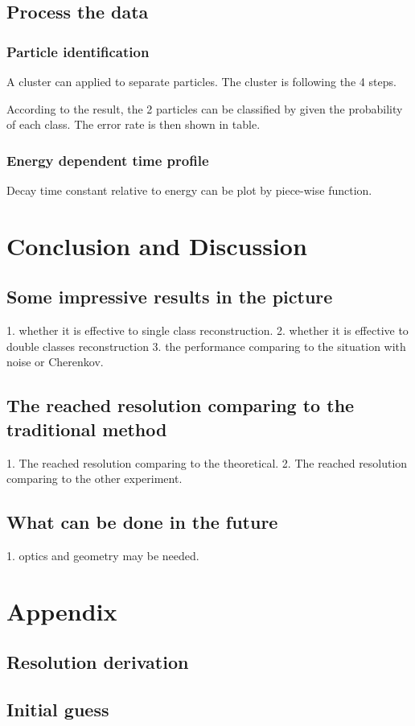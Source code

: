 \documentclass{article}
\begin{document}
\subsection{Process the data} 
\subsubsection{Particle identification}
\par A cluster can applied to separate particles. The cluster is following the 4 steps.
\par According to the result, the 2 particles can be classified by given the probability of each class. The error rate is then shown in table.
\subsubsection{Energy dependent time profile}
\par Decay time constant relative to energy can be plot by piece-wise function.

\section{Conclusion and Discussion}
\subsection{Some impressive results in the picture}
1. whether it is effective to single class reconstruction. 2. whether it is effective to double classes reconstruction 3. the performance comparing to the situation with noise or Cherenkov. \\
\subsection{The reached resolution comparing to the traditional method}
1. The reached resolution comparing to the theoretical. 2. The reached resolution comparing to the other experiment.\\
\subsection{What can be done in the future}
1. optics and geometry may be needed. \\

\section{Appendix}
\subsection{Resolution derivation}
\subsection{Initial guess}
\end{document}
